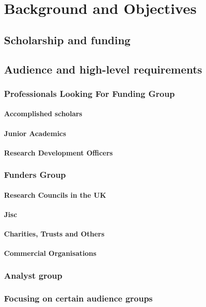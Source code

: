 \chapter{Background and Objectives}
\section{Scholarship and funding}
\section{Audience and high-level requirements}
\subsection{Professionals Looking For Funding Group}
\subsubsection{Accomplished scholars}
\subsubsection{Junior Academics}
\subsubsection{Research Development Officers}
\subsection{Funders Group}
\subsubsection{Research Councils in the UK}
\subsubsection{Jisc}
\subsubsection{Charities, Trusts and Others}
\subsubsection{Commercial Organisations}
\subsection{Analyst group}
\subsection{Focusing on certain audience groups}
